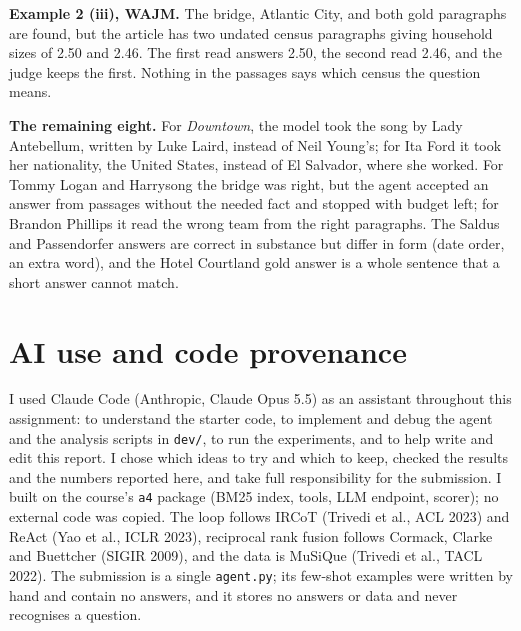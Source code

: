 \documentclass[10pt,a4paper]{article}
\begin{document}
\textbf{Example 2 (iii), WAJM.} The bridge, Atlantic City, and both gold paragraphs are
found, but the article has two undated census paragraphs giving household sizes of 2.50 and 2.46. The first read
answers 2.50, the second read 2.46, and the judge keeps the first. Nothing in the passages says which census the
question means.

\textbf{The remaining eight.} For \emph{Downtown}, the model took the song by Lady Antebellum, written by Luke Laird, instead
of Neil Young's; for Ita Ford it took her nationality, the United States, instead of El Salvador, where she worked.
For Tommy Logan and Harrysong the bridge was right, but the agent accepted an answer from passages without the
needed fact and stopped with budget left; for Brandon Phillips it read the wrong team from the right paragraphs. The Saldus and Passendorfer answers are
correct in substance but differ in form (date order, an extra word), and the Hotel Courtland gold answer is a whole
sentence that a short answer cannot match.

\section{AI use and code provenance}
I used Claude Code (Anthropic, Claude Opus 5.5) as an assistant throughout this assignment: to understand the
starter code, to implement and debug the agent and the analysis scripts in \texttt{dev/}, to run the experiments, and
to help write and edit this report. I chose which ideas to try and which to keep, checked the results and the
numbers reported here, and take full responsibility for the submission. I built on the course's \texttt{a4} package
(BM25 index, tools, LLM endpoint, scorer); no external code was copied. The loop follows IRCoT (Trivedi
et al., ACL 2023) and ReAct (Yao et al., ICLR 2023), reciprocal rank fusion follows Cormack, Clarke and Buettcher
(SIGIR 2009), and the data is MuSiQue (Trivedi et al., TACL 2022). The submission is a single \texttt{agent.py}; its
few-shot examples were written by hand and contain no answers, and it stores no answers or data and never
recognises a question.
\end{document}
